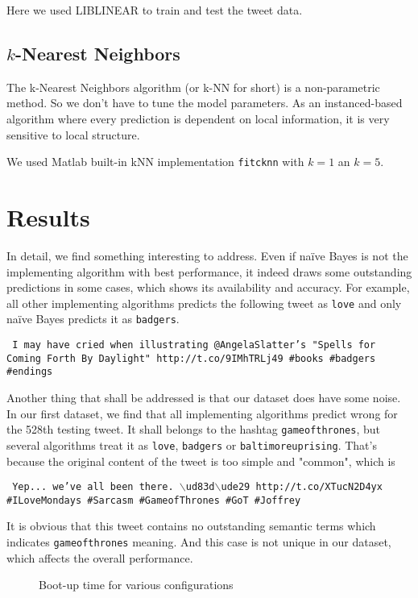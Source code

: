 \documentclass[letterpaper,11pt,twocolumn]{article}
\begin{document}
Here we used LIBLINEAR to train and test the tweet data.

\subsection{$k$-Nearest Neighbors}
The k-Nearest Neighbors algorithm (or k-NN for short) is a non-parametric method. So we don't have to tune the model parameters. As an instanced-based algorithm where every prediction is dependent on local information, it is very sensitive to local structure.

We used Matlab built-in kNN implementation \texttt{fitcknn} with $k = 1$ an $k = 5$.

\section{Results}
\label{sec:resu}
In detail, we find something interesting to address. Even if na{\"i}ve Bayes is not the implementing algorithm with best performance, it indeed draws some outstanding predictions in some cases, which shows its availability and accuracy. For example, all other implementing algorithms predicts the following tweet as \texttt{love} and only na{\"i}ve Bayes predicts it as \texttt{badgers}.
\begin{framed}
\texttt{
I may have cried when illustrating @AngelaSlatter's "Spells for Coming Forth By Daylight" http://t.co/9IMhTRLj49 #books #badgers #endings
}
\end{framed}
Another thing that shall be addressed is that our dataset does have some noise. In our first dataset, we find that all implementing algorithms predict wrong for the 528th testing tweet. It shall belongs to the hashtag \texttt{gameofthrones}, but several algorithms treat it as \texttt{love}, \texttt{badgers} or \texttt{baltimoreuprising}. That's because the original content of the tweet is too simple and "common", which is
\begin{framed}
\texttt{
Yep... we've all been there. $\backslash$ud83d$\backslash$ude29 http://t.co/XTucN2D4yx  \#ILoveMondays \#Sarcasm \#GameofThrones \#GoT \#Joffrey
}
\end{framed}
It is obvious that this tweet contains no outstanding semantic terms which indicates \texttt{gameofthrones} meaning. And this case is not unique in our dataset, which affects the overall performance.

\begin{figure*}[!htb]
\centering
{}
\caption{Boot-up time for various configurations}
\label{figure:eval}
\end{figure*}
\end{document}

